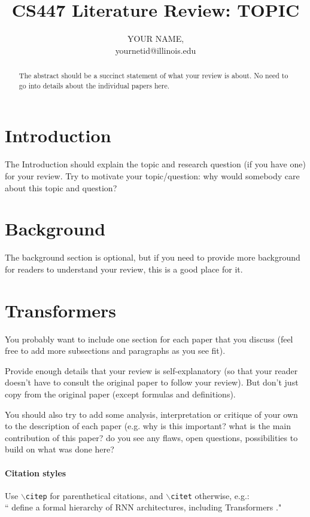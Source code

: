 \documentclass[letterpaper, 11pt]{article}
\title{CS447 Literature Review: TOPIC}
\author{YOUR NAME,\\ yournetid@illinois.edu}
\begin{document}
\maketitle

\begin{abstract}
The abstract should be a succinct statement of what your review is about. No need to go into details about the individual papers here. 
\end{abstract}

\section{Introduction}
\label{sec:introduction}
The Introduction should explain the topic and research question (if you have one) for your review. Try to motivate your topic/question: why would somebody care about this topic and question? 

\section{Background}
\label{sec:background}
The background section is optional, but if you need to provide more background for readers to understand your review, this is a good place for it. 


\section{Transformers}
\label{sec:transformers} 
You probably want to include one section for each paper that you discuss (feel free to add more subsections and paragraphs as you see fit). 

Provide enough details that your review is self-explanatory (so that your reader doesn't have to consult the original paper to follow your review). But don't just copy from the original paper (except formulas and definitions). 

You should also try to add some analysis, interpretation or critique of your own to the description of each paper (e.g. why is this important? what is the main contribution of this paper? do you see any flaws, open questions, possibilities to build on what was done here?

\paragraph{Citation styles}
Use \texttt{$\backslash$citep} for parenthetical citations, and  \texttt{$\backslash$citet} otherwise, e.g.:\hfill\\ 
``\citet{merrill-etal-2020-formal} define a formal hierarchy of RNN architectures, including Transformers \citep{NIPS2017_3f5ee243}."
\end{document}
